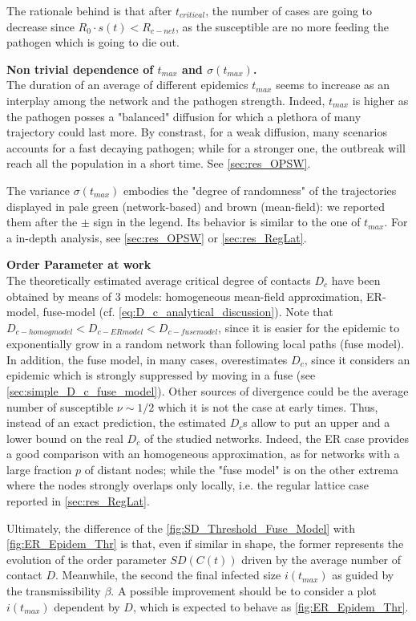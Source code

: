\documentclass[a4paper,10pt,twoside]{book} %
\theoremstyle{definition}
\begin{document}
The rationale behind is that after $ t_{critical}$, the number of cases are going to decrease since $R_0 \cdot s(t) < R_{c-net}$, as the susceptible are no more feeding the pathogen which is going to die out.

\textbf{Non trivial dependence of $ t_{max}$ and $ \sigma(t_{max})$.} \\
The duration of an average of different epidemics $t_{max}$ seems to increase as an interplay among the network and the pathogen strength. Indeed, $ t_{max}$ is higher as the pathogen posses a "balanced" diffusion for which a plethora of many trajectory could last more. By constrast, for a weak diffusion, many scenarios accounts for a fast decaying pathogen; while for a stronger one, the outbreak will reach all the population in a short time. See \autoref{sec:res_OPSW}. 

The variance $\sigma(t_{max})$ embodies the "degree of randomness" of the trajectories displayed in pale green (network-based) and brown (mean-field): we reported them after the $\pm$ sign in the legend. Its behavior is similar to the one of $t_{max}$. For a in-depth analysis, see \autoref{sec:res_OPSW} or \autoref{sec:res_RegLat}.

\textbf{Order Parameter at work}\\

The theoretically estimated average critical degree of contacts $D_c$ have been obtained by means of 3 models: homogeneous mean-field approximation, ER-model, fuse-model (cf. \autoref{eq:D_c_analytical_discussion}).
Note that $D_{c-homog model} < D_{c-ER model} < D_{c-fuse model}$, since it is easier for the epidemic to exponentially grow in a random network than following local paths (fuse model). In addition, the fuse model, in many cases, overestimates $D_c$, since it considers an epidemic which is strongly suppressed by moving in a fuse (see \autoref{sec:simple_D_c_fuse_model}). Other sources of divergence could be the average number of susceptible $ \nu \sim 1/2$ which it is not the case at early times. Thus, instead of an exact prediction, the estimated $ D_c$s allow to put an upper and a lower bound on the real $D_c$ of the studied networks. Indeed, the ER case provides a good comparison with an homogeneous approximation, as for networks with a large fraction $ p$ of distant nodes; while the "fuse model" is on the other extrema where the nodes strongly overlaps only locally, i.e. the regular lattice case reported in \autoref{sec:res_RegLat}.

Ultimately, the difference of the \autoref{fig:SD_Threshold_Fuse_Model} with \autoref{fig:ER_Epidem_Thr} is that, even if similar in shape, the former represents the evolution of the order parameter $SD(C(t))$ driven by the average number of contact $D$. Meanwhile, the second the final infected size $ i(t_{max})$ as guided by the transmissibility $ \beta$. A possible improvement should be to consider a plot $ i(t_{max})$ dependent by $D$, which is expected to behave as \autoref{fig:ER_Epidem_Thr}.
\end{document}
